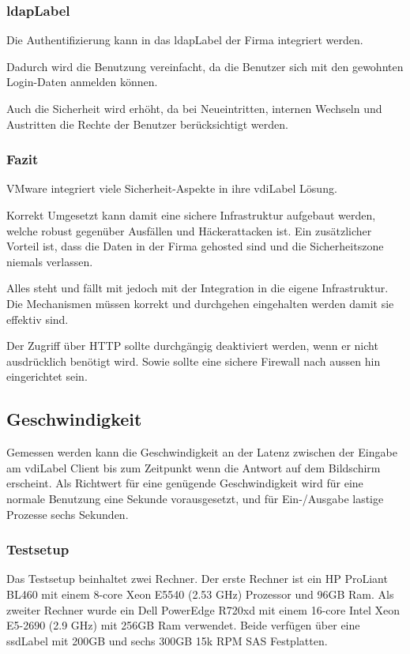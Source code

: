\subsubsection{\Gls{ldapLabel}}
Die Authentifizierung kann in das \Gls{ldapLabel} der Firma integriert werden.

Dadurch wird die Benutzung vereinfacht, da die Benutzer sich mit den gewohnten Login-Daten anmelden können.

Auch die Sicherheit wird erhöht, da bei Neueintritten, internen Wechseln und Austritten die Rechte der Benutzer berücksichtigt werden.

\subsubsection{Fazit}
VMware integriert viele Sicherheit-Aspekte in ihre \Gls{vdiLabel} Lösung.

Korrekt Umgesetzt kann damit eine sichere Infrastruktur aufgebaut werden, welche robust gegenüber Ausfällen und Häckerattacken ist. Ein zusätzlicher Vorteil ist, dass die Daten in der Firma gehosted sind und die Sicherheitszone niemals verlassen.

Alles steht und fällt mit jedoch mit der Integration in die eigene Infrastruktur. Die Mechanismen müssen korrekt und durchgehen eingehalten werden damit sie effektiv sind. 

Der Zugriff über HTTP sollte durchgängig deaktiviert werden, wenn er nicht ausdrücklich benötigt wird. Sowie sollte eine sichere Firewall nach aussen hin eingerichtet sein.

\subsection{Geschwindigkeit}
Gemessen werden kann die Geschwindigkeit an der Latenz zwischen der Eingabe am \Gls{vdiLabel} Client bis zum Zeitpunkt wenn die Antwort auf dem Bildschirm erscheint. Als Richtwert für eine genügende Geschwindigkeit wird für eine normale Benutzung eine Sekunde vorausgesetzt, und für Ein-/Ausgabe lastige Prozesse sechs Sekunden.

\subsubsection{Testsetup}
Das Testsetup beinhaltet zwei Rechner. Der erste Rechner ist ein HP ProLiant BL460 mit einem 8-core Xeon E5540 (2.53 GHz) Prozessor und 96GB Ram. Als zweiter Rechner wurde ein Dell PowerEdge R720xd mit einem 16-core Intel Xeon E5-2690 (2.9 GHz) mit 256GB Ram verwendet.
Beide verfügen über eine \Gls{ssdLabel} mit 200GB und sechs 300GB 15k RPM SAS Festplatten.

